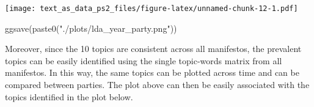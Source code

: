 \documentclass[
]{article}
\newenvironment{Shaded}{\begin{snugshade}}{\end{snugshade}}
\newcommand{\FunctionTok}[1]{\textcolor[rgb]{0.00,0.00,0.00}{#1}}
\newcommand{\NormalTok}[1]{#1}
\newcommand{\StringTok}[1]{\textcolor[rgb]{0.31,0.60,0.02}{#1}}
\begin{document}
\texttt{[image: text\_as\_data\_ps2\_files/figure-latex/unnamed-chunk-12-1.pdf]}

\begin{Shaded}
\begin{Highlighting}[]
\FunctionTok{ggsave}\NormalTok{(}\FunctionTok{paste0}\NormalTok{(}\StringTok{"./plots/lda\_year\_party.png"}\NormalTok{))}
\end{Highlighting}
\end{Shaded}

Moreover, since the 10 topics are consistent across all manifestos, the
prevalent topics can be easily identified using the single topic-words
matrix from all manifestos. In this way, the same topics can be plotted
across time and can be compared between parties. The plot above can then
be easily associated with the topics identified in the plot below.
\end{document}
